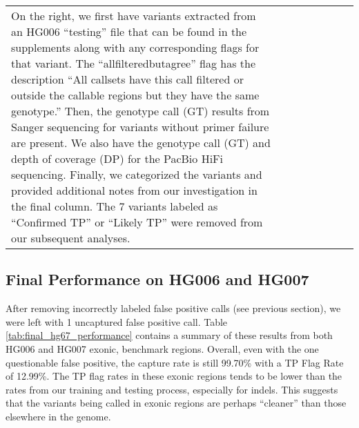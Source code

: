 \begin{landscape}
\begin{longtable}{|l|l|p{}|p{}||l|p{}|p{}|p{}|}
{        On the right, we first have variants extracted from an HG006 ``testing'' file that can be found in the supplements along with any corresponding flags for that variant.  
        The ``allfilteredbutagree'' flag has the description ``All callsets have this call filtered or outside the callable regions but they have the same genotype.''
        Then, the genotype call (GT) results from Sanger sequencing for variants without primer failure are present.
        We also have the genotype call (GT) and depth of coverage (DP) for the PacBio HiFi sequencing.
        Finally, we categorized the variants and provided additional notes from our investigation in the final column.
        The 7 variants labeled as ``Confirmed TP'' or ``Likely TP'' were removed from our subsequent analyses.
    }
    \label{tab:sanger_summary}
\end{longtable}

\end{landscape}
\restoregeometry

\subsection{Final Performance on HG006 and HG007}
After removing incorrectly labeled false positive calls (see previous section), we were left with 1 uncaptured false positive call.
Table \ref{tab:final_hg67_performance} contains a summary of these results from both HG006 and HG007 exonic, benchmark regions.
Overall, even with the one questionable false positive, the capture rate is still 99.70\% with a TP Flag Rate of 12.99\%.
The TP flag rates in these exonic regions tends to be lower than the rates from our training and testing process, especially for indels.
This suggests that the variants being called in exonic regions are perhaps ``cleaner'' than those elsewhere in the genome.

